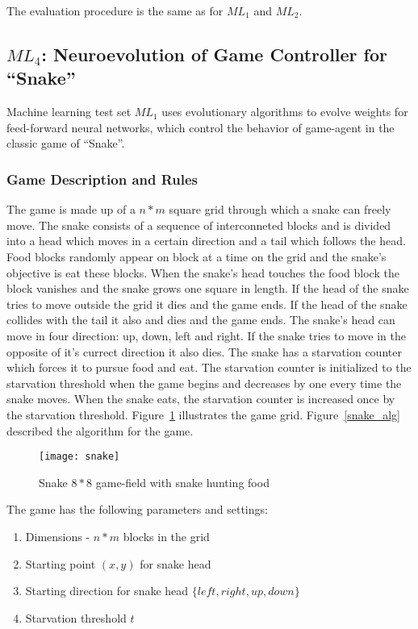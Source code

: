The evaluation procedure is the same as for $ML_{1}$ and $ML_{2}$.


\subsection{$ML_{4}$: Neuroevolution of Game Controller for ``Snake''}

Machine learning test set $ML_{1}$ uses evolutionary algorithms to evolve weights for feed-forward neural networks, which control the behavior of game-agent in the classic game of ``Snake''.

\subsubsection{Game Description and Rules}

The game is made up of a $n*m$ square grid through which a snake can freely move. The snake consists of a sequence of interconneted blocks and is divided into a head which moves in a certain direction and a tail which follows the head. Food blocks randomly appear on block at a time on the grid and the snake's objective is eat these blocks. When the snake's head touches the food block the block vanishes and the snake grows one square in length. If the head of the snake tries to move outside the grid it dies and the game ends. If the head of the snake collides with the tail it also and dies and the game ends. The snake's head can move in four direction: up, down, left and right. If the snake tries to move in the opposite of it's currect direction it also dies. The snake has a starvation counter which forces it to pursue food and eat. The starvation counter is initialized to the starvation threshold when the game begins and decreases by one every time the snake moves. When the snake eats, the starvation counter is increased once by the starvation threshold. Figure~\ref{snake} illustrates the game grid. Figure~\ref{snake_alg} described the algorithm for the game.

\begin{figure}[H]
  \centering
  \texttt{[image: snake]}
  \caption{Snake $8*8$ game-field with snake hunting food}
  \label{snake}
\end{figure}

The game has the following parameters and settings:

\begin{enumerate}
  \item Dimensions - $n*m$ blocks in the grid
  \item Starting point $(x,y)$ for snake head
  \item Starting direction for snake head $\{left,right,up,down\}$
  \item Starvation threshold $t$
\end{enumerate}

